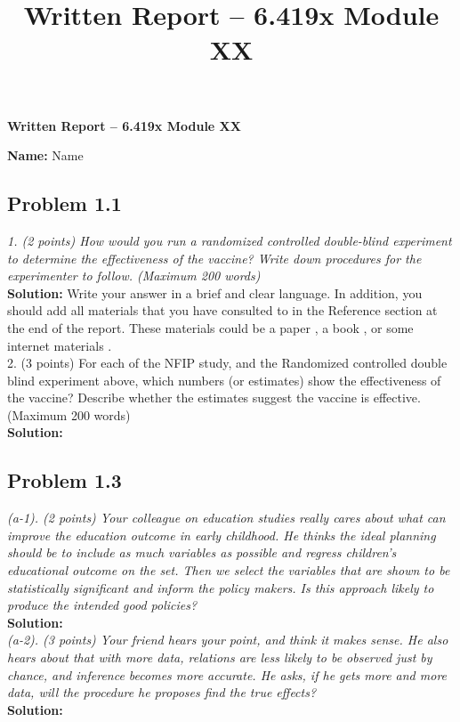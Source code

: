\documentclass[letterpaper, 11pt]{article}
\title{Written Report – 6.419x Module XX}
\begin{document}
\begin{center}
    \textbf{\LARGE Written Report – 6.419x Module XX}
\end{center}
\begin{flushright}
    \textbf{Name:} Name
\end{flushright}


\subsection*{Problem 1.1 }

\textit{1. (2 points) How would you run a randomized controlled double-blind experiment to determine the effectiveness of the vaccine? Write down procedures for the experimenter to follow. (Maximum 200 words)} \\
\textbf{Solution:} Write your answer in a brief and clear language. In addition, you should add all materials that you have consulted to in the Reference section at the end of the report.  These materials could be a paper \cite{ASA:2016}, a book \cite{HuLiu:2004}, or some internet materials \cite{opinion:lexicon}. \\

2. (3 points) For each of the NFIP study, and the Randomized controlled double blind experiment above, which numbers (or estimates) show the effectiveness of the vaccine? Describe whether the estimates suggest the vaccine is effective.(Maximum 200 words) \\
\textbf{Solution:} \\

\subsection*{Problem 1.3}

\textit{(a-1). (2 points) Your colleague on education studies really cares about what can improve the education outcome in early childhood. He thinks the ideal planning should be to include as much variables as possible and regress children's educational outcome on the set. Then we select the variables that are shown to be statistically significant and inform the policy makers. Is this approach likely to produce the intended good policies?} \\
\textbf{Solution:} \\

\textit{(a-2). (3 points) Your friend hears your point, and think it makes sense. He also hears about that with more data, relations are less likely to be observed just by chance, and inference becomes more accurate. He asks, if he gets more and more data, will the procedure he proposes find the true effects?} \\
\textbf{Solution:} \\

\break


\end{document}
